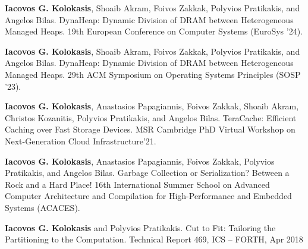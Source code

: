 \vspace{-15pt}
\begin{cventries}
  \cventry
    {}
    {}
    {}
    {}
    {\textbf{Iacovos G. Kolokasis}, Shoaib Akram, Foivos
    Zakkak, Polyvios Pratikakis, and Angelos Bilas.%
	DynaHeap: Dynamic Division of DRAM between Heterogeneous Managed Heaps.
  19th European Conference on Computer Systems (EuroSys '24).
	}
  {}

  \cventry
    {}
    {}
    {}
    {}
    {\textbf{Iacovos G. Kolokasis}, Shoaib Akram, Foivos
    Zakkak, Polyvios Pratikakis, and Angelos Bilas.%
	DynaHeap: Dynamic Division of DRAM between Heterogeneous Managed Heaps.
  29th ACM Symposium on Operating Systems Principles (SOSP '23).
	}
  {}

  \cventry
    {}
    {}
    {}
    {}
    {\textbf{Iacovos G. Kolokasis}, Anastasios Papagiannis, Foivos
    Zakkak, Shoaib Akram, Christos Kozanitis, Polyvios Pratikakis, and Angelos Bilas.%
	TeraCache: Efficient Caching over Fast Storage Devices. 
	MSR Cambridge PhD Virtual Workshop on Next-Generation Cloud Infrastructure'21.
	}
  {}

  \cventry
    {}
    {}
    {}
    {}
    {\textbf{Iacovos G. Kolokasis}, Anastasios Papagiannis, Foivos
    Zakkak, Polyvios Pratikakis, and Angelos Bilas.%
	Garbage
    Collection or Serialization? Between a Rock and a Hard Place! 
    16th International Summer School on Advanced Computer Architecture
    and Compilation for High-Performance and Embedded Systems
    (ACACES).}
  {}

\end{cventries}
      

\vspace{-15pt}
\begin{cventries}

  \cventry
    {}
    {}
    {}
    {}
    {\textbf{Iacovos G. Kolokasis} and Polyvios Pratikakis.
      Cut to Fit: Tailoring the Partitioning to the Computation.
      Technical Report 469, ICS -- FORTH, Apr 2018 }{}%


\end{cventries}
